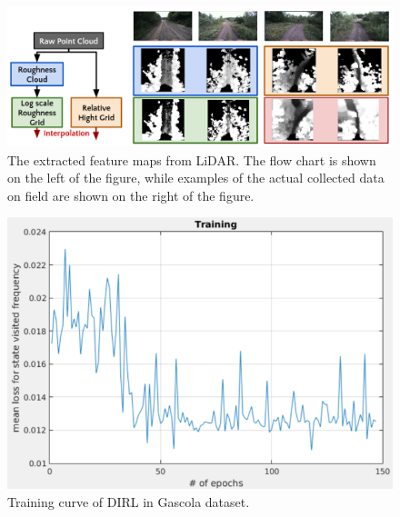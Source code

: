 \documentclass[../thesis.tex]{subfiles}
\begin{document}
\begin{figure}[t]
        \begin{center}
         \centerline{\includegraphics[width=\columnwidth]{./DIRL/fig/lidar_feature_map.png}}
               \caption{The extracted feature maps from LiDAR. The flow chart is shown on the left of the figure, while examples of the actual collected data on field are shown on the right of the figure.}
               \label{fig:lidar_feature_map}
        \end{center}
        \vskip -0.2in
\end{figure}
 
 
\begin{figure}[t]
        \begin{center}
         \centerline{\includegraphics[width=0.5\columnwidth]{./DIRL/fig/dirl_training_curve.png}}
               \caption{Training curve of DIRL in Gascola dataset.}
               \label{fig:dirl_learning_curve}
        \end{center}
        \vskip -0.2in
\end{figure}
  
\end{document}
